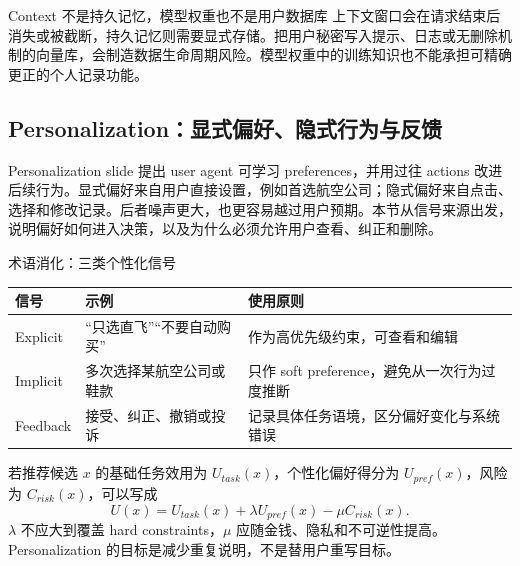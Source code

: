 \begin{warningbox}{Context 不是持久记忆，模型权重也不是用户数据库}
上下文窗口会在请求结束后消失或被截断，持久记忆则需要显式存储。把用户秘密写入提示、日志或无删除机制的向量库，会制造数据生命周期风险。模型权重中的训练知识也不能承担可精确更正的个人记录功能。
\end{warningbox}


\subsection{Personalization：显式偏好、隐式行为与反馈}

Personalization slide 提出 user agent 可学习 preferences，并用过往 actions 改进后续行为。显式偏好来自用户直接设置，例如首选航空公司；隐式偏好来自点击、选择和修改记录。后者噪声更大，也更容易越过用户预期。本节从信号来源出发，说明偏好如何进入决策，以及为什么必须允许用户查看、纠正和删除。


\begin{knowledgebox}{术语消化：三类个性化信号}
\begin{tabularx}{\textwidth}{L{0.18\textwidth}X X}
\toprule
信号 & 示例 & 使用原则 \\
\midrule
Explicit & “只选直飞”“不要自动购买” & 作为高优先级约束，可查看和编辑 \\
Implicit & 多次选择某航空公司或鞋款 & 只作 soft preference，避免从一次行为过度推断 \\
Feedback & 接受、纠正、撤销或投诉 & 记录具体任务语境，区分偏好变化与系统错误 \\
\bottomrule
\end{tabularx}
\end{knowledgebox}

若推荐候选 $x$ 的基础任务效用为 $U_{task}(x)$，个性化偏好得分为 $U_{pref}(x)$，风险为 $C_{risk}(x)$，可以写成
\[
U(x)=U_{task}(x)+\lambda U_{pref}(x)-\mu C_{risk}(x).
\]
$\lambda$ 不应大到覆盖 hard constraints，$\mu$ 应随金钱、隐私和不可逆性提高。Personalization 的目标是减少重复说明，不是替用户重写目标。


